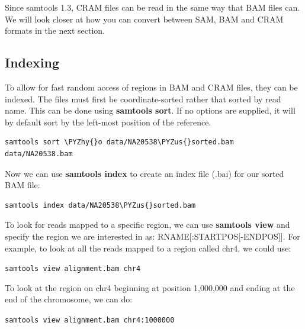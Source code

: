 \documentclass[11pt]{article}
\makeatletter
\def\PYZus{\char`\_}
\def\PYZhy{\char`\-}
\newcommand{\boxspacing}{\kern\kvtcb@left@rule\kern\kvtcb@boxsep}
\newcommand{\prompt}[4]{
        {\ttfamily\llap{{\color{#2}[#3]:\hspace{3pt}#4}}\vspace{-\baselineskip}}
    }
\makeatother
\begin{document}
Since samtools 1.3, CRAM files can be read in the same way that BAM
files can. We will look closer at how you can convert between SAM, BAM
and CRAM formats in the next section.

    \hypertarget{indexing}{%
\subsection{Indexing}\label{indexing}}

To allow for fast random access of regions in BAM and CRAM files, they
can be indexed. The files must first be coordinate-sorted rather that
sorted by read name. This can be done using \textbf{samtools sort}. If
no options are supplied, it will by default sort by the left-most
position of the reference.

    \begin{tcolorbox}[breakable, size=fbox, boxrule=1pt, pad at break*=1mm,colback=cellbackground, colframe=cellborder]
\prompt{In}{incolor}{ }{\boxspacing}
\begin{Verbatim}[commandchars=\\\{\}]
samtools sort \PYZhy{}o data/NA20538\PYZus{}sorted.bam data/NA20538.bam
\end{Verbatim}
\end{tcolorbox}

    Now we can use \textbf{samtools index} to create an index file (.bai)
for our sorted BAM file:

    \begin{tcolorbox}[breakable, size=fbox, boxrule=1pt, pad at break*=1mm,colback=cellbackground, colframe=cellborder]
\prompt{In}{incolor}{ }{\boxspacing}
\begin{Verbatim}[commandchars=\\\{\}]
samtools index data/NA20538\PYZus{}sorted.bam
\end{Verbatim}
\end{tcolorbox}

    To look for reads mapped to a specific region, we can use
\textbf{samtools view} and specify the region we are interested in as:
RNAME{[}:STARTPOS{[}-ENDPOS{]}{]}. For example, to look at all the reads
mapped to a region called chr4, we could use:

    \texttt{samtools\ view\ alignment.bam\ chr4}

    To look at the region on chr4 beginning at position 1,000,000 and ending
at the end of the chromosome, we can do:

    \texttt{samtools\ view\ alignment.bam\ chr4:1000000}
\end{document}
